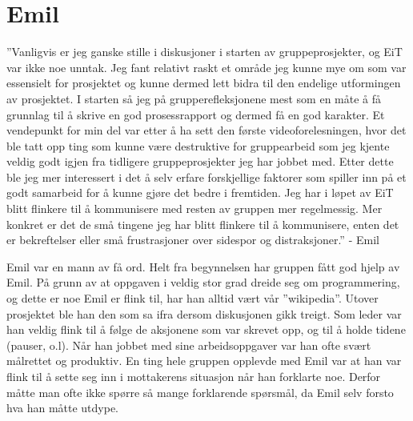 \section{Emil}
''Vanligvis er jeg ganske stille i diskusjoner i starten av gruppeprosjekter, og EiT var ikke noe unntak.
Jeg fant relativt raskt et område jeg kunne mye om som var essensielt for prosjektet og kunne dermed lett bidra til den endelige utformingen av prosjektet.
I starten så jeg på grupperefleksjonene mest som en måte å få grunnlag til å skrive en god prosessrapport og dermed få en god karakter.
Et vendepunkt for min del var etter å ha sett den første videoforelesningen, hvor det ble tatt opp ting som kunne være destruktive for gruppearbeid som jeg kjente veldig godt igjen fra tidligere gruppeprosjekter jeg har jobbet med.
Etter dette ble jeg mer interessert i det å selv erfare forskjellige faktorer som spiller inn på et godt samarbeid for å kunne gjøre det bedre i fremtiden.
Jeg har i løpet av EiT blitt flinkere til å kommunisere med resten av gruppen mer regelmessig.
Mer konkret er det de små tingene jeg har blitt flinkere til å kommunisere, enten det er bekreftelser eller små frustrasjoner over sidespor og distraksjoner.'' 
\hfill - Emil
\vspace{\secspace}

Emil var en mann av få ord.
Helt fra begynnelsen har gruppen fått god hjelp av Emil. 
På grunn av at oppgaven i veldig stor grad dreide seg om programmering, og dette er noe Emil er flink til, har han alltid vært vår ''wikipedia''. 
Utover prosjektet ble han den som sa ifra dersom diskusjonen gikk treigt. 
Som leder var han veldig flink til å følge de aksjonene som var skrevet opp, og til å holde tidene (pauser, o.l). 
Når han jobbet med sine arbeidsoppgaver var han ofte svært målrettet og produktiv. 
En ting hele gruppen opplevde med Emil var at han var flink til å sette seg inn i mottakerens situasjon når han forklarte noe. 
Derfor måtte man ofte ikke spørre så mange forklarende spørsmål, da Emil selv forsto hva han måtte utdype. 